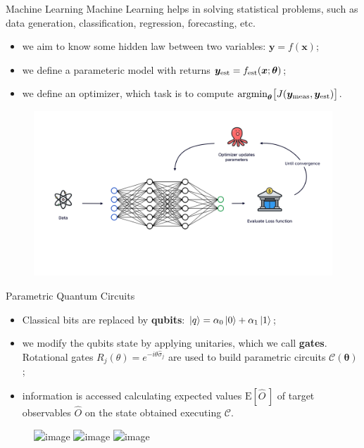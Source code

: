 \documentclass[8pt, xcolor={svgnames}, hyperref={linkcolor=black}]{beamer}
\begin{document}
\begin{frame}{Machine Learning}
\vspace{0.5cm}
Machine Learning helps in solving statistical problems, such as data generation, 
classification, regression, forecasting, etc.
\pause

\begin{itemize}
\item[\faCrosshairs] we aim to know some hidden law between two variables: $\bm{y}=f(\bm{x})$;
\pause
\item[\faBarChart] we define a parameteric model with returns $\bm{y}_{\rm est}=f_{\rm est}(\bm{x}; \bm{\theta})$;
\pause
\item[\faBinoculars] we define an optimizer, which task is to compute 
   $\text{argmin}_{\bm{\theta}}\bigl[J(\bm{y}_{\rm meas}, \bm{y}_{\rm est})\bigr]$.
\end{itemize}
\pause
\begin{figure}  
    \includegraphics[width=1\textwidth]{figures/ml_scheme.png}
\end{figure}
\end{frame}

\begin{frame}{Parametric Quantum Circuits}
\pause
  \begin{itemize}
  \item<2,3,4>[\faMagic] Classical bits are replaced by \textbf{qubits}: 
  $\ket{q}=\alpha_0 \ket{0} + \alpha_1 \ket{1}$;  
  \item<3,4>[\faCog] we modify the qubits state by applying unitaries, which we call \textbf{gates}.\\
  Rotational gates $R_j(\theta)=e^{-i\theta\hat{\sigma}_j}$ are used to build
  parametric circuits $\mathcal{C}(\bm{\theta})$;
  \item<4>[\faEye] information is accessed calculating expected values $\text{E}[\hat{O}\,]$
  of target observables $\hat{O}$ on the state obtained executing $\mathcal{C}$.
  \end{itemize}
    \begin{figure}
       \includegraphics<2>[width=0.8\textwidth]{figures/vqc_1.png}
       \includegraphics<3>[width=0.8\textwidth]{figures/vqc_2.png}
       \includegraphics<4>[width=0.8\textwidth]{figures/vqc.png}   
    \end{figure}
\end{frame}
\end{document}
